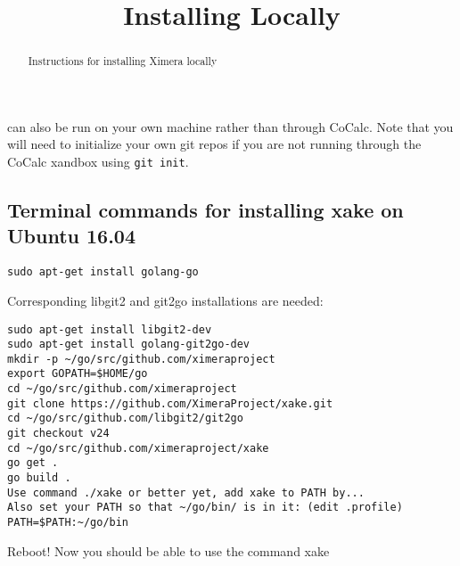 \documentclass{ximera}
\title{Installing Locally}
\begin{document}
\begin{abstract}
Instructions for installing Ximera locally
\end{abstract}
\maketitle


 can also be run on your own machine rather than through CoCalc. Note that you will need to initialize your own git repos if you are not running through the CoCalc xandbox using \verb!git init!.

\subsection{Terminal commands for installing xake on Ubuntu 16.04}
\begin{verbatim}
sudo apt-get install golang-go
\end{verbatim}
Corresponding libgit2 and git2go installations are needed:
\begin{verbatim}
sudo apt-get install libgit2-dev
sudo apt-get install golang-git2go-dev
mkdir -p ~/go/src/github.com/ximeraproject
export GOPATH=$HOME/go
cd ~/go/src/github.com/ximeraproject
git clone https://github.com/XimeraProject/xake.git
cd ~/go/src/github.com/libgit2/git2go
git checkout v24
cd ~/go/src/github.com/ximeraproject/xake
go get .
go build .
Use command ./xake or better yet, add xake to PATH by...
Also set your PATH so that ~/go/bin/ is in it: (edit .profile)
PATH=$PATH:~/go/bin
\end{verbatim}
Reboot!  Now you should be able to use the command xake
\end{document}
